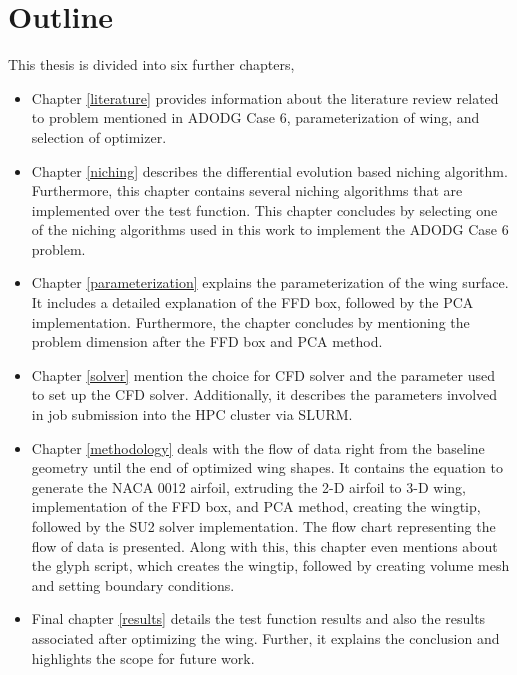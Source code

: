 \section{Outline}
This thesis is divided into six further chapters,
\begin{itemize}
\item Chapter \ref{literature} provides information about the literature review related to problem mentioned in ADODG Case 6, parameterization of wing, and selection of optimizer.
\item Chapter \ref{niching} describes the differential evolution based niching algorithm. Furthermore, this chapter contains several niching algorithms that are implemented over the test function. This chapter concludes by selecting one of the niching algorithms used in this work to implement the ADODG Case 6 problem. 
\item Chapter \ref{parameterization} explains the parameterization of the wing surface. It includes a detailed explanation of the FFD box, followed by the PCA implementation. Furthermore, the chapter concludes by mentioning the problem dimension after the FFD box and PCA method. 
\item Chapter \ref{solver} mention the choice for CFD solver and the parameter used to set up the CFD solver. Additionally, it describes the parameters involved in job submission into the HPC cluster via SLURM. 
\item Chapter \ref{methodology} deals with the flow of data right from the baseline geometry until the end of optimized wing shapes. It contains the equation to generate the NACA 0012 airfoil, extruding the 2-D airfoil to 3-D wing, implementation of the FFD box, and PCA method, creating the wingtip, followed by the SU2 solver implementation. The flow chart representing the flow of data is presented. Along with this, this chapter even mentions about the glyph script, which creates the wingtip, followed by creating volume mesh and setting boundary conditions. 
\item  Final chapter \ref{results} details the test function results and also the results associated after optimizing the wing. Further, it explains the conclusion and highlights the scope for future work. 
\end{itemize}
